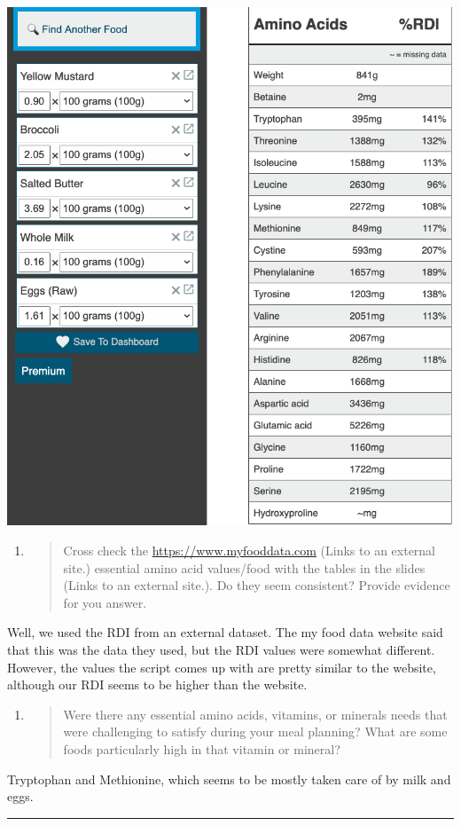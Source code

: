 \documentclass[letterpaper]{article}
\begin{document}
\begin{center}
\includegraphics[width=.9\linewidth]{KBe20bio201retFoodDataProteinAminosDiet1.png}
\end{center}

\begin{enumerate}
\item \begin{quote}
Cross check the \url{https://www.myfooddata.com} (Links to an external
site.) essential amino acid values/food with the tables in the
slides (Links to an external site.). Do they seem consistent?
Provide evidence for you answer.
\end{quote}
\end{enumerate}

Well, we used the RDI from an external dataset. The my food data website
said that this was the data they used, but the RDI values were somewhat
different. However, the values the script comes up with are pretty
similar to the website, although our RDI seems to be higher than the
website.

\begin{enumerate}
\item \begin{quote}
Were there any essential amino acids, vitamins, or minerals needs
that were challenging to satisfy during your meal planning? What
are some foods particularly high in that vitamin or mineral?
\end{quote}
\end{enumerate}

Tryptophan and Methionine, which seems to be mostly taken care of by
milk and eggs.

\noindent\rule{\textwidth}{0.5pt}
\end{document}
